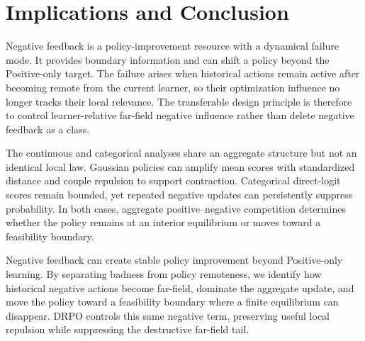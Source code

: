 \section{Implications and Conclusion}
\label{sec:conclusion}

Negative feedback is a policy-improvement resource with a dynamical failure mode. It provides boundary information and can shift a policy beyond the Positive-only target. The failure arises when historical actions remain active after becoming remote from the current learner, so their optimization influence no longer tracks their local relevance. The transferable design principle is therefore to control learner-relative far-field negative influence rather than delete negative feedback as a class.

The continuous and categorical analyses share an aggregate structure but not an identical local law. Gaussian policies can amplify mean scores with standardized distance and couple repulsion to support contraction. Categorical direct-logit scores remain bounded, yet repeated negative updates can persistently suppress probability. In both cases, aggregate positive--negative competition determines whether the policy remains at an interior equilibrium or moves toward a feasibility boundary.

Negative feedback can create stable policy improvement beyond Positive-only learning. By separating badness from policy remoteness, we identify how historical negative actions become far-field, dominate the aggregate update, and move the policy toward a feasibility boundary where a finite equilibrium can disappear. DRPO controls this same negative term, preserving useful local repulsion while suppressing the destructive far-field tail.
